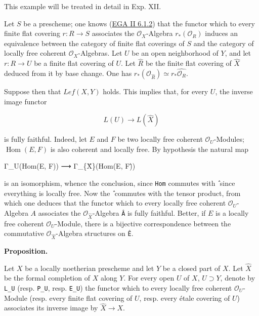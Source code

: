 \documentclass[
  11pt,
  a4paper,
]{book}
\newenvironment{Shaded}{}{}
\newcommand{\NormalTok}[1]{#1}
\begin{document}
This example will be treated in detail in Exp. XII.

Let \(S\) be a prescheme; one knows
(\href{https://jcreinhold.github.io/ega/ii/02-06-integral-finite-morphisms.html\#61-preschemes-integral-over-another}{EGA
II 6.1.2}) that the functor which to every finite flat covering
\(r: R \to S\) associates the \(\mathcal{O}_{X}\)-Algebra
\(r_{*}(\mathcal{O}_{R})\) induces an equivalence between the category
of finite flat coverings of \(S\) and the category of locally free
coherent \(\mathcal{O}_{X}\)-Algebras. Let \(U\) be an open neighborhood
of \(Y\), and let \(r: R \to U\) be a finite flat covering of \(U\). Let
\(\hat{R}\) be the finite flat covering of \(\hat{X}\) deduced from it
by base change. One has \(\hat{r}_{*}(\mathcal{O}_{\hat{R}}) \simeq
r_{*}\hat{\mathcal{O}_{R}}\).

Suppose then that \(Lef(X, Y)\) holds. This implies that, for every
\(U\), the inverse image functor

\[ L(U) \longrightarrow L(\hat{X}) \]

is fully faithful. Indeed, let \(E\) and \(F\) be two locally free
coherent \(\mathcal{O}_{U}\)-Modules; \(\operatorname{Hom}(E, F)\) is
also coherent and locally free. By hypothesis the natural map

\begin{Shaded}
\begin{Highlighting}[]
\NormalTok{Γ\_U(Hom(E, F)) ⟶ Γ\_\{X̂\}(Hom(E, F)̂)}
\end{Highlighting}
\end{Shaded}

is an isomorphism, whence the conclusion, since \texttt{Hom} commutes
with \texttt{̂} since everything is locally free. Now the \texttt{̂}
commutes with the tensor product, from which one deduces that the
functor which to every locally free coherent \(\mathcal{O}_{U}\)-Algebra
\(A\) associates the \(\mathcal{O}_{\hat{X}}\)-Algebra \texttt{Â} is
fully faithful. Better, if \(E\) is a locally free coherent
\(\mathcal{O}_{U}\)-Module, there is a bijective correspondence between
the commutative \(\mathcal{O}_{\hat{X}}\)-Algebra structures on
\texttt{Ê}.

\textbf{Proposition.}

Let \(X\) be a locally noetherian prescheme and let \(Y\) be a closed
part of \(X\). Let \(\hat{X}\) be the formal completion of \(X\) along
\(Y\). For every open \(U\) of \(X\), \(U \supset Y\), denote by
\texttt{L\_U} (resp. \texttt{P\_U}, resp. \texttt{E\_U}) the functor
which to every locally free coherent \(\mathcal{O}_{U}\)-Module (resp.
every finite flat covering of \(U\), resp. every étale covering of
\(U\)) associates its inverse image by \(\hat{X} \to X\).
\end{document}
